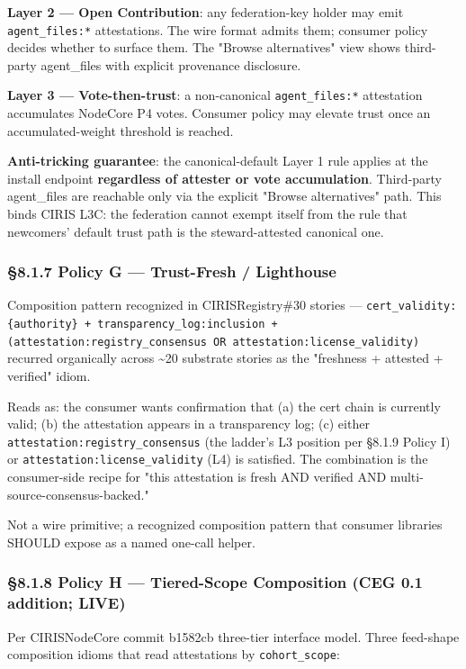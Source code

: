 \documentclass[10pt]{article}
\begin{document}
\textbf{Layer 2 — Open Contribution}: any federation-key holder may emit \texttt{agent\_files:*} attestations. The wire format admits them; consumer policy decides whether to surface them. The "Browse alternatives" view shows third-party agent\_files with explicit provenance disclosure.


\textbf{Layer 3 — Vote-then-trust}: a non-canonical \texttt{agent\_files:*} attestation accumulates NodeCore P4 votes. Consumer policy may elevate trust once an accumulated-weight threshold is reached.


\textbf{Anti-tricking guarantee}: the canonical-default Layer 1 rule applies at the install endpoint \textbf{regardless of attester or vote accumulation}. Third-party agent\_files are reachable only via the explicit "Browse alternatives" path. This binds CIRIS L3C: the federation cannot exempt itself from the rule that newcomers' default trust path is the steward-attested canonical one.


\subsubsection*{§8.1.7 Policy G — Trust-Fresh / Lighthouse}


Composition pattern recognized in CIRISRegistry\#30 stories — \texttt{cert\_validity:\{authority\} + transparency\_log:inclusion + (attestation:registry\_consensus OR attestation:license\_validity)} recurred organically across \textasciitilde{}20 substrate stories as the "freshness + attested + verified" idiom.


Reads as: the consumer wants confirmation that (a) the cert chain is currently valid; (b) the attestation appears in a transparency log; (c) either \texttt{attestation:registry\_consensus} (the ladder's L3 position per §8.1.9 Policy I) or \texttt{attestation:license\_validity} (L4) is satisfied. The combination is the consumer-side recipe for "this attestation is fresh AND verified AND multi-source-consensus-backed."


Not a wire primitive; a recognized composition pattern that consumer libraries SHOULD expose as a named one-call helper.


\subsubsection*{§8.1.8 Policy H — Tiered-Scope Composition (CEG 0.1 addition; LIVE)}


Per CIRISNodeCore commit b1582cb three-tier interface model. Three feed-shape composition idioms that read attestations by \texttt{cohort\_scope}:
\end{document}

